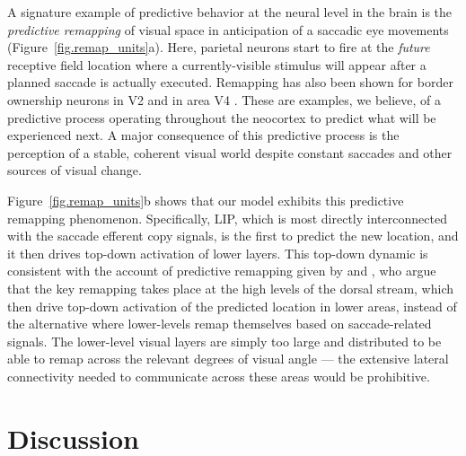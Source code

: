 \documentclass[11pt,twoside]{article}
\newif\myifpdf
\begin{document}
A signature example of predictive behavior at the neural level in the brain is the {\em predictive remapping} of visual space in anticipation of a saccadic eye movements \citep{DuhamelColbyGoldberg92,ColbyDuhamelGoldberg97,GottliebKusunokiGoldberg98,NakamuraColby02,MarinoMazer16} (Figure~\ref{fig.remap_units}a).  Here, parietal neurons start to fire at the {\em future} receptive field location where a currently-visible stimulus will appear after a planned saccade is actually executed. Remapping has also been shown for border ownership neurons in V2 \citep{OHerronHeydt13} and in area V4 \citep{NeupaneGuittonPack16,NeupaneGuittonPack20}. These are examples, we believe, of a predictive process operating throughout the neocortex to predict what will be experienced next.  A major consequence of this predictive process is the perception of a stable, coherent visual world despite constant saccades and other sources of visual change. 

Figure~\ref{fig.remap_units}b shows that our model exhibits this predictive remapping phenomenon.  Specifically, LIP, which is most directly interconnected with the saccade efferent copy signals, is the first to predict the new location, and it then drives top-down activation of lower layers.  This top-down dynamic is consistent with the account of predictive remapping given by \citet{Wurtz08} and \citet{CavanaghHuntAfrazEtAl10}, who argue that the key remapping takes place at the high levels of the dorsal stream, which then drive top-down activation of the predicted location in lower areas, instead of the alternative where lower-levels remap themselves based on saccade-related signals.  The lower-level visual layers are simply too large and distributed to be able to remap across the relevant degrees of visual angle --- the extensive lateral connectivity needed to communicate across these areas would be prohibitive.

\section{Discussion}
\end{document}
